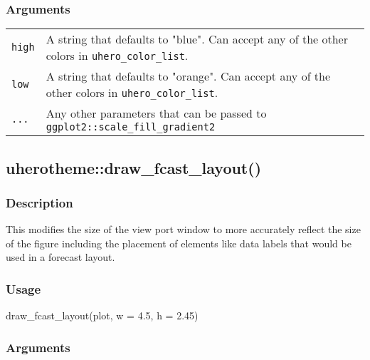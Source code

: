 \documentclass[
  letterpaper,
  DIV=11,
  numbers=noendperiod]{scrreport}
\newenvironment{Shaded}{\begin{snugshade}}{\end{snugshade}}
\newcommand{\AttributeTok}[1]{\textcolor[rgb]{0.40,0.45,0.13}{#1}}
\newcommand{\FloatTok}[1]{\textcolor[rgb]{0.68,0.00,0.00}{#1}}
\newcommand{\FunctionTok}[1]{\textcolor[rgb]{0.28,0.35,0.67}{#1}}
\newcommand{\NormalTok}[1]{\textcolor[rgb]{0.00,0.23,0.31}{#1}}
\begin{document}
\subsubsection{Arguments}\label{arguments-76}

\begin{longtable}[]{@{}ll@{}}
\toprule\noalign{}
\endhead
\bottomrule\noalign{}
\endlastfoot
\texttt{high} & A string that defaults to "blue". Can accept any of the
other colors in \texttt{uhero\_color\_list}. \\
\texttt{low} & A string that defaults to "orange". Can accept any of the
other colors in \texttt{uhero\_color\_list}. \\
\texttt{...} & Any other parameters that can be passed to
\texttt{ggplot2::scale\_fill\_gradient2} \\
\end{longtable}

\subsection{uherotheme::draw\_fcast\_layout()}\label{uherothemedraw_fcast_layout}

\subsubsection{Description}\label{description-77}

This modifies the size of the view port window to more accurately
reflect the size of the figure including the placement of elements like
data labels that would be used in a forecast layout.

\subsubsection{Usage}\label{usage-77}

\begin{Shaded}
\begin{Highlighting}[]
\FunctionTok{draw\_fcast\_layout}\NormalTok{(plot, }\AttributeTok{w =} \FloatTok{4.5}\NormalTok{, }\AttributeTok{h =} \FloatTok{2.45}\NormalTok{)}
\end{Highlighting}
\end{Shaded}

\subsubsection{Arguments}\label{arguments-77}
\end{document}

